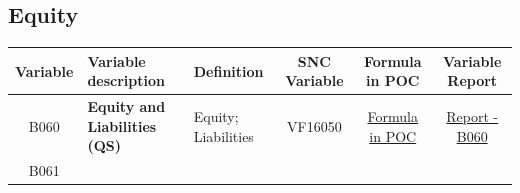 \documentclass[]{book}
\begin{document}
\hypertarget{equity}{%
\subsection{Equity}\label{equity}}

\begin{longtable}[]{@{}cllccc@{}}
\toprule
\begin{minipage}[b]{0.08\columnwidth}\centering
Variable\strut
\end{minipage} & \begin{minipage}[b]{0.20\columnwidth}\raggedright
Variable description\strut
\end{minipage} & \begin{minipage}[b]{0.16\columnwidth}\raggedright
Definition\strut
\end{minipage} & \begin{minipage}[b]{0.09\columnwidth}\centering
SNC Variable\strut
\end{minipage} & \begin{minipage}[b]{0.15\columnwidth}\centering
Formula in POC\strut
\end{minipage} & \begin{minipage}[b]{0.16\columnwidth}\centering
Variable Report\strut
\end{minipage}\tabularnewline
\midrule
\endhead
\begin{minipage}[t]{0.08\columnwidth}\centering
B060\strut
\end{minipage} & \begin{minipage}[t]{0.20\columnwidth}\raggedright
\textbf{Equity and Liabilities (QS)}\strut
\end{minipage} & \begin{minipage}[t]{0.16\columnwidth}\raggedright
Equity; Liabilities\strut
\end{minipage} & \begin{minipage}[t]{0.09\columnwidth}\centering
VF16050\strut
\end{minipage} & \begin{minipage}[t]{0.15\columnwidth}\centering
\protect\hyperlink{b060---formula-in-poc}{Formula in POC}\strut
\end{minipage} & \begin{minipage}[t]{0.16\columnwidth}\centering
\href{./Auxiliary\%20Files/technical_reports/variable_report/B060(!).pdf}{Report - B060}\strut
\end{minipage}\tabularnewline
\begin{minipage}[t]{0.08\columnwidth}\centering
B061\strut

\end{minipage}
\end{longtable}
\end{document}
